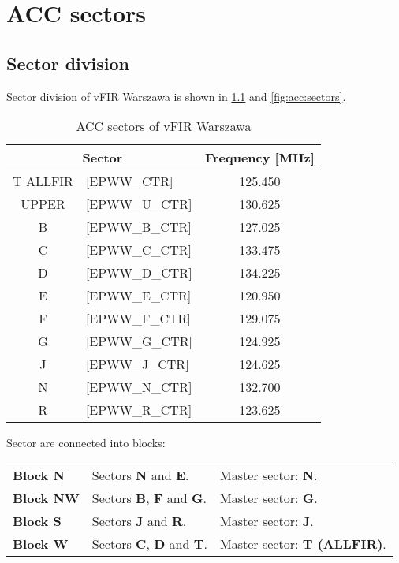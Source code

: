 
\chapter{ACC sectors}
\label{chap:acc:sectors}

\section{Sector division}

Sector division of vFIR Warszawa is shown in \cref{tab:acc:sectors} and \cref{fig:acc:sectors}.

\begin{table}[htbp]
  \centering
  \begin{tabular}{|c l|c|}
    \hline
    \multicolumn{2}{|c|}{\cellcolor{vred}\color{white}\textbf{Sector}}&\cellcolor{vred}\color{white}\textbf{Frequency} [MHz]\\\hline
    \color{Orange}T ALLFIR & \tiny [EPWW\_CTR] & 125.450\\\hline
    \color{OliveGreen}UPPER & \tiny [EPWW\_U\_CTR] & 130.625\\\hline
    \color{ProcessBlue}B & \tiny [EPWW\_B\_CTR] & 127.025\\\hline
    \color{Orange}C & \tiny [EPWW\_C\_CTR] & 133.475\\\hline
    \color{Orange}D & \tiny [EPWW\_D\_CTR] & 134.225\\\hline
    \color{MidnightBlue}E & \tiny [EPWW\_E\_CTR] & 120.950\\\hline
    \color{ProcessBlue}F & \tiny [EPWW\_F\_CTR] & 129.075\\\hline
    \color{ProcessBlue}G & \tiny [EPWW\_G\_CTR] & 124.925\\\hline
    \color{vred}J & \tiny [EPWW\_J\_CTR] & 124.625\\\hline
    \color{MidnightBlue}N & \tiny [EPWW\_N\_CTR] & 132.700\\\hline
    \color{vred}R & \tiny [EPWW\_R\_CTR] & 123.625\\\hline
  \end{tabular}
  \caption{ACC sectors of vFIR Warszawa}
  \label{tab:acc:sectors}
\end{table}

Sector are connected into blocks:

\begin{tabular}{lll}
  \textbf{Block N}&Sectors \textbf{N} and \textbf{E}.& Master sector: \textbf{N}.\\
  \textbf{Block NW}&Sectors \textbf{B}, \textbf{F} and \textbf{G}.& Master sector: \textbf{G}.\\
  \textbf{Block S}&Sectors \textbf{J} and \textbf{R}.&Master sector: \textbf{J}.\\
  \textbf{Block W} & Sectors \textbf{C}, \textbf{D} and \textbf{T}.&Master sector: \textbf{T (ALLFIR)}.\\
\end{tabular}


